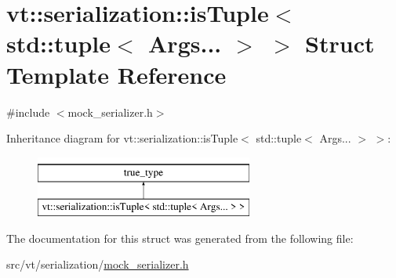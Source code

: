 \hypertarget{structvt_1_1serialization_1_1is_tuple_3_01std_1_1tuple_3_01_args_8_8_8_01_4_01_4}{}\section{vt\+:\+:serialization\+:\+:is\+Tuple$<$ std\+:\+:tuple$<$ Args... $>$ $>$ Struct Template Reference}
\label{structvt_1_1serialization_1_1is_tuple_3_01std_1_1tuple_3_01_args_8_8_8_01_4_01_4}


{\ttfamily \#include $<$mock\+\_\+serializer.\+h$>$}

Inheritance diagram for vt\+:\+:serialization\+:\+:is\+Tuple$<$ std\+:\+:tuple$<$ Args... $>$ $>$\+:\begin{figure}[H]
\begin{center}
\leavevmode
\includegraphics[height=2.000000cm]{structvt_1_1serialization_1_1is_tuple_3_01std_1_1tuple_3_01_args_8_8_8_01_4_01_4}
\end{center}
\end{figure}


The documentation for this struct was generated from the following file\+:\begin{DoxyCompactItemize}
\item 
src/vt/serialization/\hyperlink{mock__serializer_8h}{mock\+\_\+serializer.\+h}\end{DoxyCompactItemize}
